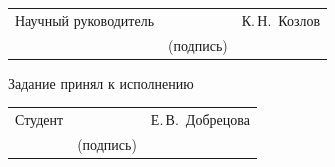 \vspace{3em}


\noindent
\begin{tabularx}{\textwidth}{X c X}
	Научный руководитель &
	\underline{\hspace{5cm}} &
	К.\,Н.~Козлов \\
	&
	{\small (подпись)} & \\
\end{tabularx}

\vspace{1.5em}

\noindent
\hspace{\tabcolsep}Задание принял к исполнению
\vspace{0.75em}

\noindent
\begin{tabularx}{\textwidth}{X c X}
	Студент &
	\underline{\hspace{5cm}} &
	Е.\,В.~Добрецова \\
	&
	{\small (подпись)} & \\
\end{tabularx}